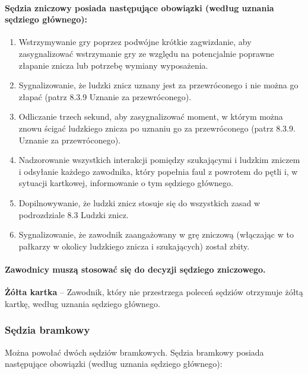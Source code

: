 \documentclass[12pt]{article}
\newcommand\yellowcard[1]{\bgroup\textcolor{darkyellow}{\textbf{#1}}}
\begin{document}
\paragraph{Sędzia zniczowy posiada następujące obowiązki (według
	uznania sędziego głównego):}

\begin{enumerate}
	\item Wstrzymywanie gry poprzez podwójne krótkie zagwizdanie, aby
	      zasygnalizować wstrzymanie gry ze względu na potencjalnie poprawne
	      złapanie znicza lub potrzebę wymiany wyposażenia.

	\item Sygnalizowanie, że ludzki znicz uznany jest za przewróconego i nie
	      można go złapać (patrz 8.3.9 Uznanie za przewróconego).

	\item Odliczanie trzech sekund, aby zasygnalizować moment, w którym można
	      znowu ścigać ludzkiego znicza po uznaniu go za przewróconego (patrz
	      8.3.9. Uznanie za przewróconego).

	\item Nadzorowanie wszystkich interakcji pomiędzy szukającymi i ludzkim
	      zniczem i odsyłanie każdego zawodnika, który popełnia faul z powrotem do
	      pętli i, w sytuacji kartkowej, informowanie o tym sędziego głównego.

	\item Dopilnowywanie, że ludzki znicz stosuje się do wszystkich zasad w
	      podrozdziale 8.3 Ludzki znicz.

	\item Sygnalizowanie, że zawodnik zaangażowany w grę zniczową (włączając w
	      to pałkarzy w okolicy ludzkiego znicza i szukających) został zbity.
\end{enumerate}

\paragraph{Zawodnicy muszą stosować się do decyzji sędziego
	zniczowego.}

\yellowcard{Żółta kartka} -- Zawodnik, który nie przestrzega poleceń sędziów
otrzymuje żółtą kartkę, według uznania sędziego głównego.

\subsubsection{Sędzia bramkowy}

Można powołać dwóch sędziów bramkowych. Sędzia bramkowy posiada
następujące obowiązki (według uznania sędziego głównego):
\end{document}
